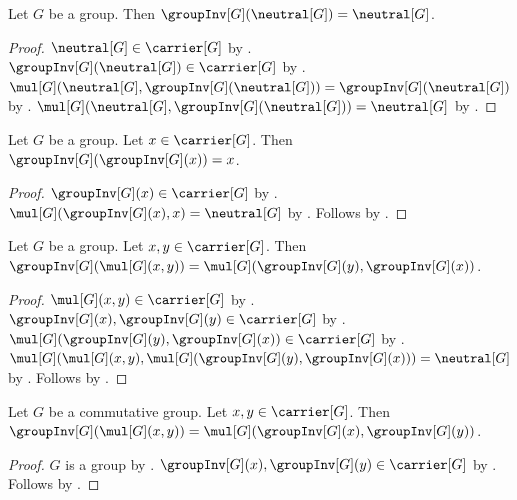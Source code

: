 \begin{proposition}\label{group_inverse_neutral}
    Let $G$ be a group.
    Then $\groupInv[G](\neutral[G])=\neutral[G]$.
\end{proposition}
\begin{proof}
    $\neutral[G]\in\carrier[G]$ by .
    $\groupInv[G](\neutral[G])\in\carrier[G]$
        by .
    $\mul[G](\neutral[G],\groupInv[G](\neutral[G]))
        =\groupInv[G](\neutral[G])$
        by .
    $\mul[G](\neutral[G],\groupInv[G](\neutral[G]))
        =\neutral[G]$
        by .
\end{proof}

\begin{theorem}\label{group_inverse_involutive}
    Let $G$ be a group.
    Let $x\in\carrier[G]$.
    Then $\groupInv[G](\groupInv[G](x))=x$.
\end{theorem}
\begin{proof}
    $\groupInv[G](x)\in\carrier[G]$
        by .
    $\mul[G](\groupInv[G](x),x)=\neutral[G]$
        by .
    Follows by .
\end{proof}

\begin{theorem}\label{group_inverse_product}
    Let $G$ be a group.
    Let $x,y\in\carrier[G]$.
    Then
        $\groupInv[G](\mul[G](x,y))
            =\mul[G](\groupInv[G](y),\groupInv[G](x))$.
\end{theorem}
\begin{proof}
    $\mul[G](x,y)\in\carrier[G]$
        by .
    $\groupInv[G](x),\groupInv[G](y)\in\carrier[G]$
        by .
    $\mul[G](\groupInv[G](y),\groupInv[G](x))\in\carrier[G]$
        by .
    $\mul[G]
        (\mul[G](x,y),
         \mul[G](\groupInv[G](y),\groupInv[G](x)))
        =\neutral[G]$
        by
        .
    Follows by .
\end{proof}

\begin{corollary}\label{commutative_group_inverse_product}
    Let $G$ be a commutative group.
    Let $x,y\in\carrier[G]$.
    Then
        $\groupInv[G](\mul[G](x,y))
            =\mul[G](\groupInv[G](x),\groupInv[G](y))$.
\end{corollary}
\begin{proof}
    $G$ is a group by .
    $\groupInv[G](x),\groupInv[G](y)\in\carrier[G]$
        by .
    Follows by
        .
\end{proof}

